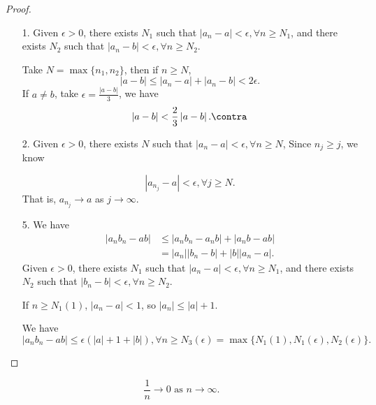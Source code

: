 \begin{proof}
    \leavevmode
    \begin{enumerate}
        \item[1.] Given \(\epsilon > 0\), there exists \(N_1\) such that \(\left\vert a_n - a \right\vert < \epsilon, \forall n \geq N_1\), and there exists \(N_2\) such that \(\left\vert a_n - b \right\vert < \epsilon, \forall n \geq N_2\).

        Take \(N = \max\{n_1, n_2\}\), then if \(n \geq N\),
        \[
            \left\vert a - b \right\vert \leq \left\vert a_n - a \right\vert +\left\vert a_n -b \right\vert < 2\epsilon.
        \]
        If \(a \neq b\), take \(\epsilon = \frac{\left\vert a - b \right\vert}{3}\), we have
        \[
            \left\vert a - b \right\vert < \frac{2}{3}\left\vert a - b \right\vert. \contra
        \]
        \item[2.] Given \(\epsilon > 0\), there exists \(N\) such that \(\left\vert a_n - a \right\vert < \epsilon, \forall n \geq N\), Since \(n_j \geq j\), we know

        \[
            \left\vert a_{n_j} - a \right\vert < \epsilon, \forall j \geq  N.
        \]
        That is, \(a_{n_j} \to a\) as \(j \to \infty\).
        \item[5.] We have
        \begin{align*}
            \left\vert a_n b_n - ab \right\vert &\leq \left\vert a_n b_n - a_n b \right\vert + \left\vert a_n b - ab \right\vert\\
            &= \left\vert a_n \right\vert \left\vert b_n - b \right\vert + \left\vert b \right\vert \left\vert a_n - a \right\vert.
        \end{align*}
        Given \(\epsilon > 0\), there exists \(N_1\) such that \(\left\vert a_n - a \right\vert < \epsilon, \forall n \geq N_1\), and there exists \(N_2\) such that \(\left\vert b_n - b \right\vert < \epsilon, \forall n \geq N_2\).

        If \(n \geq N_1(1)\), \(\left\vert a_n - a \right\vert < 1 \), so \(\left\vert a_n \right\vert \leq \left\vert a \right\vert + 1\).

        We have
        \[
            \left\vert a_n b_n - ab \right\vert \leq \epsilon(\left\vert a \right\vert +1+\left\vert b \right\vert), \forall n \geq N_3(\epsilon) = \max\{N_1(1),N_1(\epsilon),N_2(\epsilon)\}.
        \]
    \end{enumerate}
\end{proof}
\begin{lemma}
    \leavevmode
    \[
        \frac{1}{n} \to 0 \text{ as } n\to \infty.
    \]
\end{lemma}
